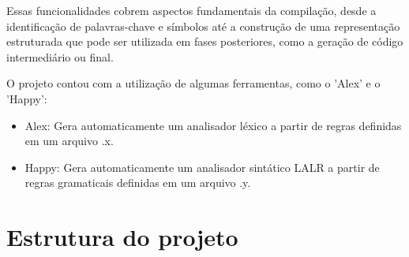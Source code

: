 \documentclass{article}
\begin{document}
Essas funcionalidades cobrem aspectos fundamentais da compilação, desde a identificação de palavras-chave e símbolos até a construção de uma representação estruturada que pode ser utilizada em fases posteriores, como a geração de código intermediário ou final.

O projeto contou com a utilização de algumas ferramentas, como o 'Alex' e o 'Happy':
\begin{itemize}
    \item Alex: Gera automaticamente um analisador léxico a partir de regras definidas em um arquivo .x.
    \item Happy: Gera automaticamente um analisador sintático LALR a partir de regras gramaticais definidas em um arquivo .y.
\end{itemize}
\section{Estrutura do projeto}
\end{document}
